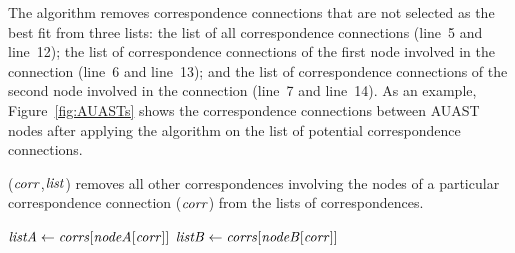 The  algorithm removes correspondence connections that are not selected as the best fit from three lists: the list of all correspondence connections (line~5 and line~12);
the list of correspondence connections of the first node involved in the connection (line~6 and line~13); and the list of correspondence connections of the second node involved in the connection (line~7 and line~14). As an example, Figure~\ref{fig:AUASTs} shows the correspondence connections between AUAST nodes after applying the  algorithm on the list of potential correspondence connections.

\begin{algorithm}
\caption{($\mathit{corr}$,$\mathit{list}$) removes all other correspondences involving the nodes of a particular correspondence connection ($\mathit{corr}$) from the lists of correspondences.}
\label{removeOtherCEs}
  \begin{algorithmic}[1]
  \RemoveOtherCEs
       \State $\mathit{listA} \gets \mathit{corrs}[\mathit{nodeA}[\mathit{corr}]]$
	   \State $\mathit{listB} \gets \mathit{corrs}[\mathit{nodeB}[\mathit{corr}]]$
	   		 \EndIf
	   \EndFor		
	 	 	 		 
	   		 \EndIf
	   \EndFor	  	
  \end{algorithmic}
\end{algorithm}




